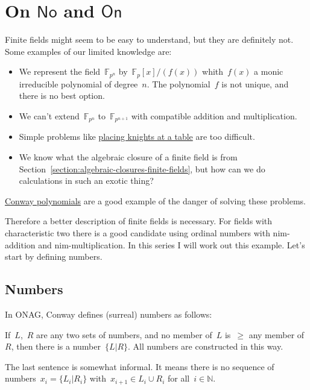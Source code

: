 \section{On \texorpdfstring{$\mathsf{No}$}{No} and \texorpdfstring{$\mathsf{On}$}{On}}
Finite fields might seem to be easy to understand, but they are definitely not. Some examples of our limited knowledge are:
\begin{itemize}
  \item We represent the field~$\mathbb{F}_{p^n}$ by~$\mathbb{F}_p[x]/(f(x))$ whith~$f(x)$ a monic irreducible polynomial of degree~$n$. The polynomial~$f$ is not unique, and there is no best option.
  \item We can't extend~$\mathbb{F}_{p^n}$ to~$\mathbb{F}_{p^{n+1}}$ with compatible addition and multiplication.
  \item Simple problems like \href{http://www.neverendingbooks.org/index.php/the-odd-knights-of-the-round-table.html}{placing knights at a table} are too difficult.
  \item We know what the algebraic closure of a finite field is from Section~\ref{section:algebraic-closures-finite-fields}, but how can we do calculations in such an exotic thing?
\end{itemize}
\href{http://en.wikipedia.org/wiki/Conway_polynomial_\%28finite_fields\%29}{Conway polynomials} are a good example of the danger of solving these problems.

Therefore a better description of finite fields is necessary. For fields with characteristic two there is a good candidate using ordinal numbers with nim-addition and nim-multiplication. In this series I will work out this example. Let's start by defining numbers.

\subsection{Numbers}
In ONAG, Conway defines (surreal) numbers as follows:

\begin{definition}
  If~$L$,~$R$ are any two sets of numbers, and no member of~$L$ is~$\geq$ any member of~$R$, then there is a number~$\{L \vert R\}$. All numbers are constructed in this way.
\end{definition}

The last sentence is somewhat informal. It means there is no sequence of numbers~$x_i = \{L_i \vert R_i\}$ with~$x_{i+1} \in L_i \cup R_i$ for all~$i \in \mathbb{N}$.

